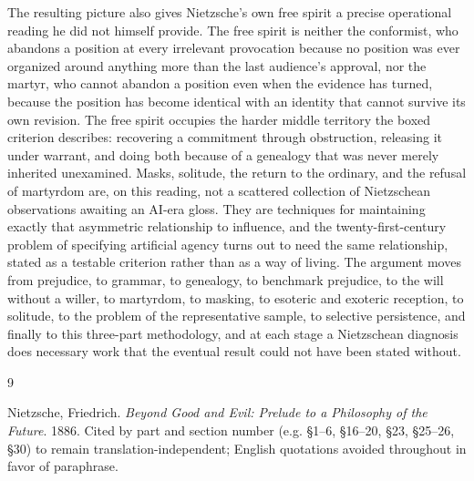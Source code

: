\documentclass[11pt]{article}
\begin{document}
The resulting picture also gives Nietzsche's own free spirit a precise operational reading he did not himself provide. The free spirit is neither the conformist, who abandons a position at every irrelevant provocation because no position was ever organized around anything more than the last audience's approval, nor the martyr, who cannot abandon a position even when the evidence has turned, because the position has become identical with an identity that cannot survive its own revision. The free spirit occupies the harder middle territory the boxed criterion describes: recovering a commitment through obstruction, releasing it under warrant, and doing both because of a genealogy that was never merely inherited unexamined. Masks, solitude, the return to the ordinary, and the refusal of martyrdom are, on this reading, not a scattered collection of Nietzschean observations awaiting an AI-era gloss. They are techniques for maintaining exactly that asymmetric relationship to influence, and the twenty-first-century problem of specifying artificial agency turns out to need the same relationship, stated as a testable criterion rather than as a way of living. The argument moves from prejudice, to grammar, to genealogy, to benchmark prejudice, to the will without a willer, to martyrdom, to masking, to esoteric and exoteric reception, to solitude, to the problem of the representative sample, to selective persistence, and finally to this three-part methodology, and at each stage a Nietzschean diagnosis does necessary work that the eventual result could not have been stated without.

\begin{thebibliography}{9}

Nietzsche, Friedrich. \emph{Beyond Good and Evil: Prelude to a Philosophy of the Future}. 1886. Cited by part and section number (e.g. \S 1--6, \S 16--20, \S 23, \S 25--26, \S 30) to remain translation-independent; English quotations avoided throughout in favor of paraphrase.

\end{thebibliography}
\end{document}
